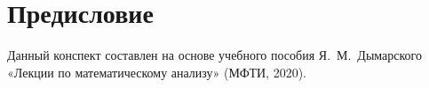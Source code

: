 \chapter*{Предисловие}

Данный конспект составлен на основе учебного пособия Я.~М.~Дымарского
«Лекции по математическому анализу» (МФТИ, 2020).
